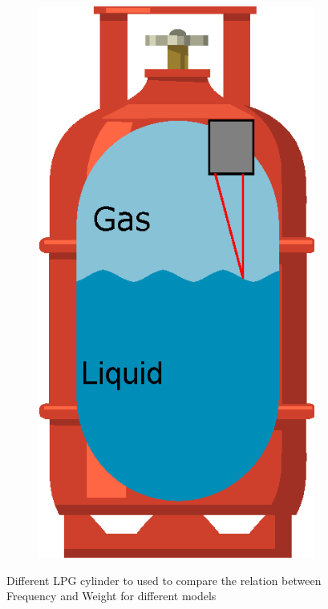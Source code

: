 \begin{figure}[!htp]
\begin{subfigure}{0.15\textwidth}
        \caption{}{}
    \end{subfigure}
    \begin{subfigure}{0.15\textwidth}
        \centering
        \includegraphics[width=\linewidth]{Chapters/2CHP/Diagrams/bottleBaseoptical.eps}
        \caption{}{}
    \end{subfigure}
    \caption{Different LPG cylinder to used to compare the relation between Frequency and Weight for different models}{\citeauthor{wuLiquidLevelDetector2014b}}
 \end{figure}
